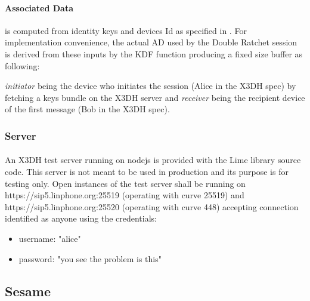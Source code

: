 \documentclass[a4paper,11pt]{article}
\begin{document}
      \label{subsubsec:X3DHAD}
      \paragraph{Associated Data} is computed from identity keys and devices Id as specified in \cite[section 3.3]{x3dh}. For implementation convenience, the actual AD used by the Double Ratchet session is derived from these inputs by the KDF function producing a fixed size buffer as following:
          \textit{initiator} being the device who initiates the session (Alice in the X3DH spec) by fetching a keys bundle on the X3DH server and \textit{receiver} being the recipient device of the first message (Bob in the X3DH spec).
    \subsubsection{Server}
      \paragraph*{}An X3DH test server running on nodejs is provided with the Lime library source code. This server is not meant to be used in production and its purpose is for testing only. Open instances of the test server shall be running on https://sip5.linphone.org:25519 (operating with curve 25519) and https://sip5.linphone.org:25520 (operating with curve 448) accepting connection identified as anyone using the credentials:
      \begin{itemize}
        \item username: "alice"
        \item password: "you see the problem is this"
      \end{itemize}

  \subsection{Sesame}
\end{document}
